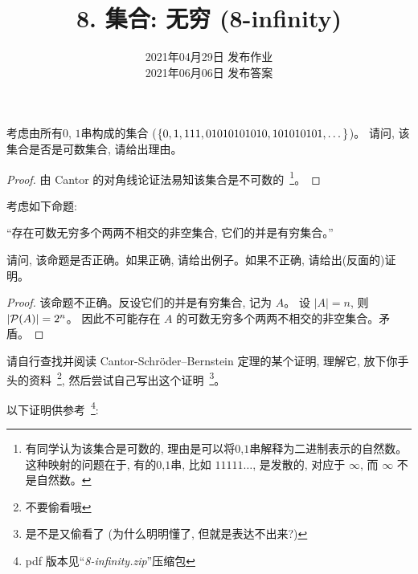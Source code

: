 \documentclass[a4paper, justified]{tufte-handout}
\title{8. 集合: 无穷 (8-infinity)}
\date{2021年04月29日 发布作业 \\ 2021年06月06日 发布答案}
\begin{document}
\maketitle
\noplagiarism %
\begin{abstract}
\end{abstract}
\beginrequired

\begin{problem}
  考虑由所有$0$, $1$串构成的集合 ($\{0, 1, 111, 01010101010, 101010101, \dots\}$)。
  请问, 该集合是否是可数集合, 请给出理由。
\end{problem}

\begin{proof}
  由 Cantor 的对角线论证法易知该集合是不可数的~\footnote{有同学认为该集合是可数的,
  理由是可以将$0$,$1$串解释为二进制表示的自然数。
  这种映射的问题在于, 有的$0$,$1$串, 比如 $11111\dots$, 是发散的,
  对应于 $\infty$, 而 $\infty$ 不是自然数。}。
\end{proof}

\begin{problem}
  考虑如下命题:

  ``存在可数无穷多个两两不相交的非空集合, 它们的并是有穷集合。''

  \noindent 请问, 该命题是否正确。如果正确, 请给出例子。如果不正确, 请给出(反面的)证明。
\end{problem}

\begin{proof}
  该命题不正确。反设它们的并是有穷集合, 记为 $A$。
  设 $|A| = n$, 则 $|\mathcal{P}(A)| = 2^{n}$。
  因此不可能存在 $A$ 的可数无穷多个两两不相交的非空集合。矛盾。
\end{proof}

\begin{problem}
  请自行查找并阅读 Cantor-Schr\"{o}der–Bernstein 定理的某个证明,
  理解它, 放下你手头的资料~\footnote{不要偷看哦}, 然后尝试自己写出这个证明~\footnote{
    是不是又偷看了 (为什么明明懂了, 但就是表达不出来?)}。

  \vspace{1em}
  \noindent 以下证明供参考~\footnote{pdf 版本见``\textsl{8-infinity.zip}''压缩包}:
  {\href{https://en.wikipedia.org/wiki/Schr\%C3\%B6der\%E2\%80\%93Bernstein\_theorem}{}}
\end{problem}
\end{document}
